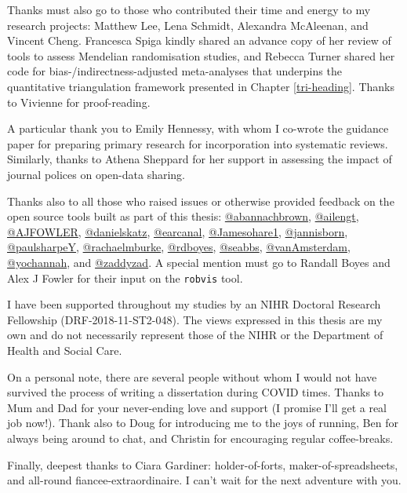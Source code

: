 \documentclass[a4paper, twoside]{templates/ociamthesis}
\begin{document}
\begin{romanpages}
\begin{acknowledgements}
  Thanks must also go to those who contributed their time and energy to my research projects: Matthew Lee, Lena Schmidt, Alexandra McAleenan, and Vincent Cheng. Francesca Spiga kindly shared an advance copy of her review of tools to assess Mendelian randomisation studies, and Rebecca Turner shared her code for bias-/indirectness-adjusted meta-analyses that underpins the quantitative triangulation framework presented in Chapter \ref{tri-heading}. Thanks to Vivienne for proof-reading.

  A particular thank you to Emily Hennessy, with whom I co-wrote the guidance paper for preparing primary research for incorporation into systematic reviews. Similarly, thanks to Athena Sheppard for her support in assessing the impact of journal polices on open-data sharing.

  Thanks also to all those who raised issues or otherwise provided feedback on the open source tools built as part of this thesis:
  \href{https://github.com/abannachbrown}{@abannachbrown}, \href{https://github.com/ailengt}{@ailengt}, \href{https://github.com/AJFOWLER}{@AJFOWLER}, \href{https://github.com/danielskatz}{@danielskatz}, \href{https://github.com/earcanal}{@earcanal}, \href{https://github.com/Jamesohare1}{@Jamesohare1}, \href{https://github.com/jannisborn}{@jannisborn}, \href{https://github.com/paulsharpeY}{@paulsharpeY}, \href{https://github.com/rachaelmburke}{@rachaelmburke}, \href{https://github.com/rdboyes}{@rdboyes}, \href{https://github.com/seabbs}{@seabbs}, \href{https://github.com/vanAmsterdam}{@vanAmsterdam}, \href{https://github.com/yochannah}{@yochannah}, and \href{https://github.com/zaddyzad}{@zaddyzad}. A special mention must go to Randall Boyes and Alex J Fowler for their input on the \texttt{robvis} tool.

  I have been supported throughout my studies by an NIHR Doctoral Research Fellowship (DRF-2018-11-ST2-048). The views expressed in this thesis are my own and do not necessarily represent those of the NIHR or the Department of Health and Social Care.

  On a personal note, there are several people without whom I would not have survived the process of writing a dissertation during COVID times. Thanks to Mum and Dad for your never-ending love and support (I promise I'll get a real job now!). Thank also to Doug for introducing me to the joys of running, Ben for always being around to chat, and Christin for encouraging regular coffee-breaks.

  Finally, deepest thanks to Ciara Gardiner: holder-of-forts, maker-of-spreadsheets, and all-round fiancee-extraordinaire. I can't wait for the next adventure with you.


\end{acknowledgements}
\end{romanpages}
\end{document}
